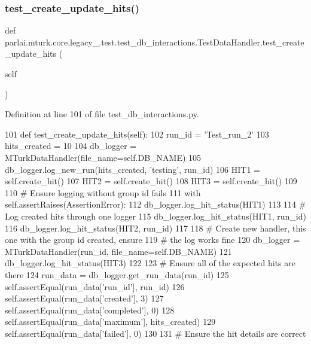 \subsubsection{\texorpdfstring{test\+\_\+create\+\_\+update\+\_\+hits()}{test\_create\_update\_hits()}}
{\footnotesize\ttfamily def parlai.\+mturk.\+core.\+legacy\+\_.\+test.\+test\+\_\+db\+\_\+interactions.\+Test\+Data\+Handler.\+test\+\_\+create\+\_\+update\+\_\+hits (\begin{DoxyParamCaption}\item[{}]{self }\end{DoxyParamCaption})}



Definition at line 101 of file test\+\_\+db\+\_\+interactions.\+py.


\begin{DoxyCode}
101     \textcolor{keyword}{def }test\_create\_update\_hits(self):
102         run\_id = \textcolor{stringliteral}{'Test\_run\_2'}
103         hits\_created = 10
104         db\_logger = MTurkDataHandler(file\_name=self.DB\_NAME)
105         db\_logger.log\_new\_run(hits\_created, \textcolor{stringliteral}{'testing'}, run\_id)
106         HIT1 = self.create\_hit()
107         HIT2 = self.create\_hit()
108         HIT3 = self.create\_hit()
109 
110         \textcolor{comment}{# Ensure logging without group id fails}
111         with self.assertRaises(AssertionError):
112             db\_logger.log\_hit\_status(HIT1)
113 
114         \textcolor{comment}{# Log created hits through one logger}
115         db\_logger.log\_hit\_status(HIT1, run\_id)
116         db\_logger.log\_hit\_status(HIT2, run\_id)
117 
118         \textcolor{comment}{# Create new handler, this one with the group id created, ensure}
119         \textcolor{comment}{# the log works fine}
120         db\_logger = MTurkDataHandler(run\_id, file\_name=self.DB\_NAME)
121         db\_logger.log\_hit\_status(HIT3)
122 
123         \textcolor{comment}{# Ensure all of the expected hits are there}
124         run\_data = db\_logger.get\_run\_data(run\_id)
125         self.assertEqual(run\_data[\textcolor{stringliteral}{'run\_id'}], run\_id)
126         self.assertEqual(run\_data[\textcolor{stringliteral}{'created'}], 3)
127         self.assertEqual(run\_data[\textcolor{stringliteral}{'completed'}], 0)
128         self.assertEqual(run\_data[\textcolor{stringliteral}{'maximum'}], hits\_created)
129         self.assertEqual(run\_data[\textcolor{stringliteral}{'failed'}], 0)
130 
131         \textcolor{comment}{# Ensure the hit details are correct}

\end{DoxyCode}
